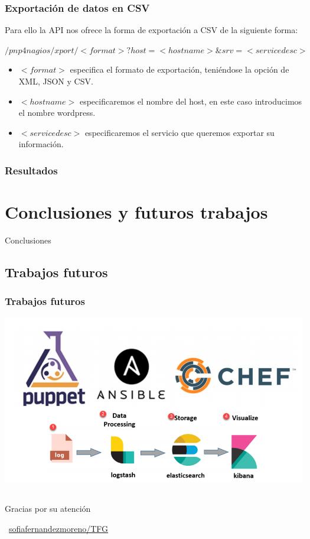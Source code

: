 \documentclass{beamer}
\theoremstyle{plain}
\theoremstyle{definition}
\theoremstyle{plain}
\theoremstyle{definition}
\theoremstyle{remark}
\theoremstyle{definition}
\begin{document}
\begin{frame}
	\frametitle{Exportación de datos en CSV}
	Para ello la API nos ofrece la forma de
	exportación a CSV de la siguiente forma:
	
	\textbf{$/pnp4nagios/xport/<format>?host=<hostname>\&srv=<servicedesc>$}
	\begin{itemize} 
	\item \textbf{$<format>$} especifica el formato de exportación, teniéndose la opción de XML, JSON y CSV.
	\item \textbf{$<hostname>$} especificaremos el nombre del host, en este caso introducimos el nombre wordpress.
	\item \textbf{$<servicedesc>$} especificaremos el servicio que queremos exportar su información.
	\end{itemize} 
\end{frame}
\begin{frame}
	\frametitle{Resultados}
\begin{frame}[plain]
\end{frame}

\end{frame}


\section{Conclusiones y futuros trabajos}

\begin{frame}
	
	\Huge{\centerline{Conclusiones}}
	
\end{frame}
\subsection{Trabajos futuros}
\begin{frame}
	\frametitle{Trabajos futuros}
	\centering
	\includegraphics[scale=0.3]{imagenes/futuro.png}
	
\end{frame}
\subsection{}
\begin{frame}{}{}
	\Huge{\centerline{Gracias por su atención}}
	\centerline{\Huge{\raisebox{-.25\height}\faGithub}~\large{\href{https://github.com/sofiafernandezmoreno/TFG}{\alert{sofiafernandezmoreno/TFG}}}}

\end{frame}
\end{document}
